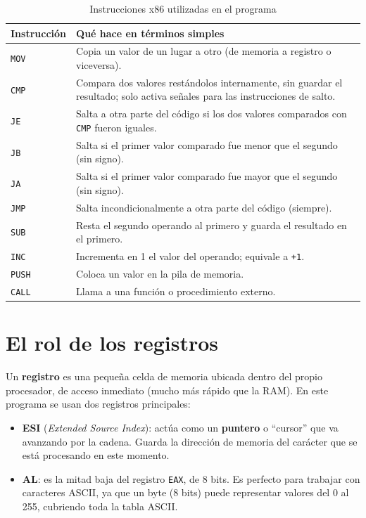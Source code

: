 \documentclass[12pt, letterpaper]{article}
\begin{document}
\begin{table}[H]
    \centering
    \begin{tabular}{@{}lp{9cm}@{}}
        \toprule
        \textbf{Instrucción} & \textbf{Qué hace en términos simples} \\
        \midrule
        \texttt{MOV} & Copia un valor de un lugar a otro (de memoria a registro o viceversa). \\
        \texttt{CMP} & Compara dos valores restándolos internamente, sin guardar el resultado; solo activa señales para las instrucciones de salto. \\
        \texttt{JE}  & Salta a otra parte del código si los dos valores comparados con \texttt{CMP} fueron iguales. \\
        \texttt{JB}  & Salta si el primer valor comparado fue menor que el segundo (sin signo). \\
        \texttt{JA}  & Salta si el primer valor comparado fue mayor que el segundo (sin signo). \\
        \texttt{JMP} & Salta incondicionalmente a otra parte del código (siempre). \\
        \texttt{SUB} & Resta el segundo operando al primero y guarda el resultado en el primero. \\
        \texttt{INC} & Incrementa en 1 el valor del operando; equivale a \texttt{+1}. \\
        \texttt{PUSH} & Coloca un valor en la pila de memoria. \\
        \texttt{CALL} & Llama a una función o procedimiento externo. \\
        \bottomrule
    \end{tabular}
    \caption{Instrucciones x86 utilizadas en el programa}
\end{table}

\section{El rol de los registros}

Un \textbf{registro} es una pequeña celda de memoria ubicada dentro del propio procesador, de acceso inmediato (mucho más rápido que la RAM). En este programa se usan dos registros principales:

\begin{itemize}
    \item \textbf{ESI} (\textit{Extended Source Index}): actúa como un \textbf{puntero} o ``cursor'' que va avanzando por la cadena. Guarda la dirección de memoria del carácter que se está procesando en este momento.
    \item \textbf{AL}: es la mitad baja del registro \texttt{EAX}, de 8 bits. Es perfecto para trabajar con caracteres ASCII, ya que un byte (8 bits) puede representar valores del 0 al 255, cubriendo toda la tabla ASCII.
\end{itemize}
\end{document}

